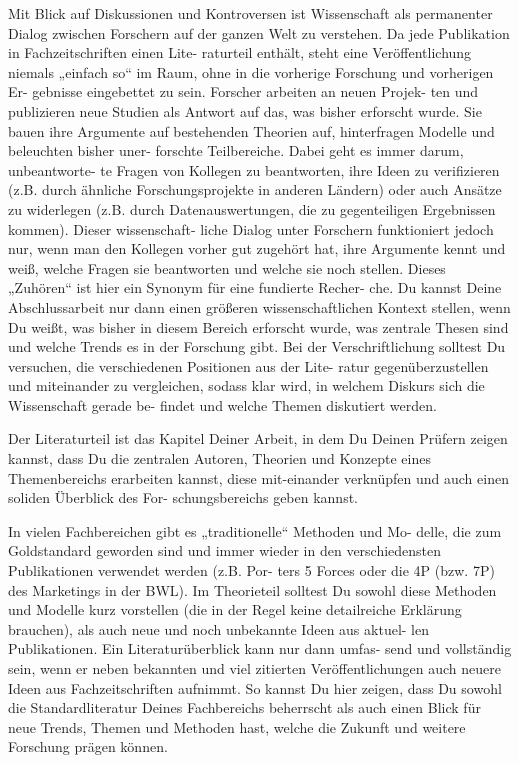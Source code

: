 Mit Blick auf Diskussionen und Kontroversen ist Wissenschaft als permanenter Dialog zwischen Forschern auf der ganzen Welt zu verstehen. Da jede Publikation in Fachzeitschriften einen Lite- raturteil enthält, steht eine Veröffentlichung niemals „einfach so“ im Raum, ohne in die vorherige Forschung und vorherigen Er- gebnisse eingebettet zu sein. Forscher arbeiten an neuen Projek- ten und publizieren neue Studien als Antwort auf das, was bisher erforscht wurde. Sie bauen ihre Argumente auf bestehenden Theorien auf, hinterfragen Modelle und beleuchten bisher uner- forschte Teilbereiche. Dabei geht es immer darum, unbeantworte- te Fragen von Kollegen zu beantworten, ihre Ideen zu verifizieren (z.B. durch ähnliche Forschungsprojekte in anderen Ländern) oder auch Ansätze zu widerlegen (z.B. durch Datenauswertungen, die zu gegenteiligen Ergebnissen kommen). Dieser wissenschaft- liche Dialog unter Forschern funktioniert jedoch nur, wenn man den Kollegen vorher gut zugehört hat, ihre Argumente kennt und weiß, welche Fragen sie beantworten und welche sie noch stellen. Dieses „Zuhören“ ist hier ein Synonym für eine fundierte Recher- che. Du kannst Deine Abschlussarbeit nur dann einen größeren wissenschaftlichen Kontext stellen, wenn Du weißt, was bisher in diesem Bereich erforscht wurde, was zentrale Thesen sind und welche Trends es in der Forschung gibt. Bei der Verschriftlichung solltest Du versuchen, die verschiedenen Positionen aus der Lite- ratur gegenüberzustellen und miteinander zu vergleichen, sodass klar wird, in welchem Diskurs sich die Wissenschaft gerade be- findet und welche Themen diskutiert werden.


Der Literaturteil ist das Kapitel Deiner Arbeit, in dem Du Deinen Prüfern zeigen kannst, dass Du die zentralen Autoren, Theorien und Konzepte eines Themenbereichs erarbeiten kannst, diese mit-einander verknüpfen und auch einen soliden Überblick des For- schungsbereichs geben kannst.


In vielen Fachbereichen gibt es „traditionelle“ Methoden und Mo- delle, die zum Goldstandard geworden sind und immer wieder in den verschiedensten Publikationen verwendet werden (z.B. Por- ters 5 Forces oder die 4P (bzw. 7P) des Marketings in der BWL). Im Theorieteil solltest Du sowohl diese Methoden und Modelle kurz vorstellen (die in der Regel keine detailreiche Erklärung brauchen), als auch neue und noch unbekannte Ideen aus aktuel- len Publikationen. Ein Literaturüberblick kann nur dann umfas- send und vollständig sein, wenn er neben bekannten und viel zitierten Veröffentlichungen auch neuere Ideen aus Fachzeitschriften aufnimmt. So kannst Du hier zeigen, dass Du sowohl die Standardliteratur Deines Fachbereichs beherrscht als auch einen Blick für neue Trends, Themen und Methoden hast, welche die Zukunft und weitere Forschung prägen können.

